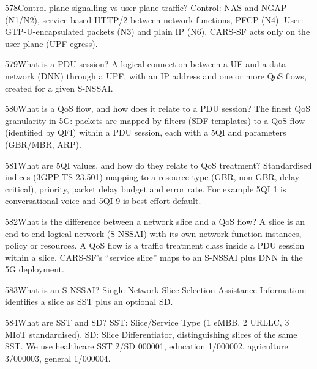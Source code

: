 \begin{qa}{578}{Control-plane signalling vs user-plane traffic?}
Control: NAS and NGAP (N1/N2), service-based HTTP/2 between network functions, PFCP (N4). User: GTP-U-encapsulated
packets (N3) and plain IP (N6). CARS-SF acts only on the user plane (UPF egress).
\end{qa}

\begin{qa}{579}{What is a PDU session?}
A logical connection between a UE and a data network (DNN) through a UPF, with an IP address and one or more QoS
flows, created for a given S-NSSAI.
\end{qa}

\begin{qa}{580}{What is a QoS flow, and how does it relate to a PDU session?}
The finest QoS granularity in 5G: packets are mapped by filters (SDF templates) to a QoS flow (identified by QFI)
within a PDU session, each with a 5QI and parameters (GBR/MBR, ARP).
\end{qa}

\begin{qa}{581}{What are 5QI values, and how do they relate to QoS treatment?}
Standardised indices (3GPP TS 23.501) mapping to a resource type (GBR, non-GBR, delay-critical), priority, packet delay
budget and error rate. For example 5QI 1 is conversational voice and 5QI 9 is best-effort default.
\end{qa}

\begin{qa}{582}{What is the difference between a network slice and a QoS flow?}
A slice is an end-to-end logical network (S-NSSAI) with its own network-function instances, policy or resources. A
QoS flow is a traffic treatment class inside a PDU session within a slice. CARS-SF's ``service slice'' maps to an
S-NSSAI plus DNN in the 5G deployment.
\end{qa}

\begin{qa}{583}{What is an S-NSSAI?}
Single Network Slice Selection Assistance Information: identifies a slice as SST plus an optional SD.
\end{qa}

\begin{qa}{584}{What are SST and SD?}
SST: Slice/Service Type (1 eMBB, 2 URLLC, 3 MIoT standardised). SD: Slice Differentiator, distinguishing slices of the
same SST. We use healthcare SST 2/SD 000001, education 1/000002, agriculture 3/000003, general 1/000004.
\end{qa}

